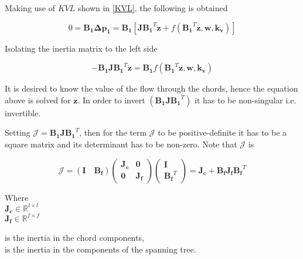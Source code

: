 Making use of $KVL$ shown in \eqref{KVL}, the following is obtained

\begin{equation}
  0 = \bm{B_1} \bm{\Delta p_1} = \bm{B_1} [ \bm{J {B_1}}^T \bm{\dot{z}} + f({\bm{B_1}}^T \bm{z}, \bm{w}, \bm{k_v})] 
 \end{equation}

Isolating the inertia matrix to the left side

\begin{equation}
 - \bm{B_1} \bm{J} \bm{{B_1}}^T \bm{\dot{z}}  = \bm{B_1} f({\bm{B_1}}^T \bm{z}, \bm{w}, \bm{k_v})
 \label{isolateZ}
 \end{equation}

It is desired to know the value of the flow through the chords, hence the equation above is solved 
for $\bm{\dot{z}}$. In order to invert $(\bm{B_1 J} \bm{{B_1}}^T)$ it has to be non-singular i.e. invertible. 

Setting $\bm{\mathcal{J}} = \bm{B_1 J} \bm{{B_1}}^T $, then for the term $\bm{\mathcal{J}}$ to be positive-definite it has to be a square matrix and its 
determinant has to be non-zero. Note that $\bm{\mathcal{J}}$ is

\begin{equation}
  \label{Jequation}
  \bm{\mathcal{J}} = (\bm{I \quad B_f}) 
  \begin{pmatrix}
    \bm{J_c}    &    \bm{0 }   \\
    \bm{0}       &   \bm{ J_f}
  \end{pmatrix}
  \begin{pmatrix}
    \bm{I}    \\
    \bm{{B_f}}^T
  \end{pmatrix}
  = \bm{J_c} + \bm{B_f J_f} \bm{{B_f}}^T
\end{equation}

\begin{minipage}[t]{0.20\textwidth}
Where\\
\hspace*{8mm} $\bm{J_c} \in \mathbb{R}^{l \times l}$  \\
\hspace*{8mm} $\bm{J_f} \in \mathbb{R}^{f \times f} $ 
\end{minipage}
\begin{minipage}[t]{0.68\textwidth}
\vspace*{2mm}
\hspace*{4mm} is the inertia in the chord components,\\
\hspace*{4mm} is the inertia in the components of the spanning tree.
\end{minipage}

